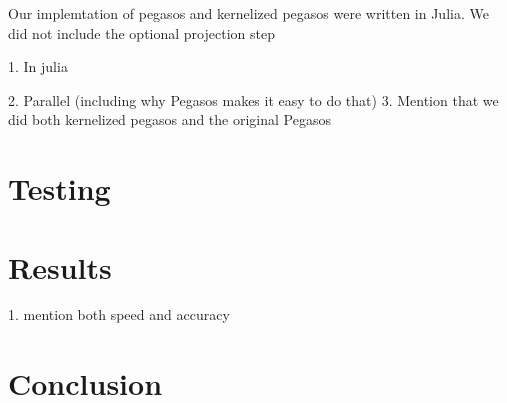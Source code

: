 \documentclass{article}
\begin{document}
Our implemtation of pegasos and kernelized pegasos were written in Julia. We did not include the optional projection step

1. In julia

2. Parallel (including why Pegasos makes it easy to do that)
3. Mention that we did both kernelized pegasos and the original Pegasos



\section{Testing}


\section{Results}
1. mention both speed and accuracy

\section{Conclusion}
\end{document}

